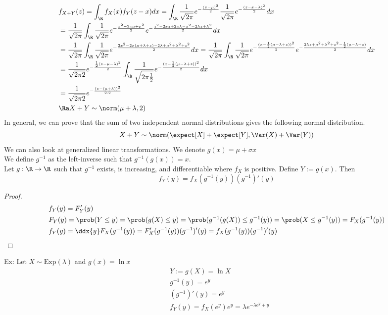 \begin{align*}
    &f_{X+Y}(z)=\int_\R f_X(x)f_Y(z-x)dx=\int_\R\frac{1}{\sqrt{2\pi}}e^{-\frac{(x-\mu)^2}{2}}\frac{1}{\sqrt{2\pi}}e^{-\frac{(z-x-\lambda)^2}{2}}dx\\
    &=\frac{1}{\sqrt{2\pi}}\int_\R\frac{1}{\sqrt{2\pi}}e^{-\frac{x^2-2x\mu+\mu^2}{2}}e^{-\frac{z^2-2xz+2x\lambda-x^2-2\lambda z+\lambda^2}{2}}dx\\
    &=\frac{1}{\sqrt{2\pi}}\int_\R\frac{1}{\sqrt{2\pi}} e^{-\frac{2x^2-2x(\mu+\lambda+z)-2\lambda+\mu^2+\lambda^2+z^2}{2}}dx=\frac{1}{\sqrt{2\pi}}\int_\R\frac{1}{\sqrt{2\pi}}e^{-\frac{(x-\frac{1}{2}(\mu-\lambda+z))^2}{2}}e^{-\frac{2\lambda z+\mu^2+\lambda^2+z^2-\frac{1}{2}(\mu-\lambda+z)}{2}}dx\\
    &=\frac{1}{\sqrt{2\pi 2}}e^{-\frac{\frac{1}{2}(z-\mu-\lambda)^2}{2}}\int_\R\frac{1}{\sqrt{2\pi\frac{1}{2}}}e^{-\frac{(x-\frac{1}{2}(\mu-\lambda+z))^2}{2}}dx\\
    &=\frac{1}{\sqrt{2\pi2}}e^{-\frac{(z-(\mu+\lambda))^2}{2\cdot 2}}\\
    &\Ra X+Y\sim\norm(\mu+\lambda,2)
\end{align*}
In general, we can prove that the sum of two independent normal distributions gives the following normal distribution.
\[X+Y\sim\norm(\expect[X]+\expect[Y],\Var(X)+\Var(Y))\]
We can also look at generalized linear transformations. We denote $g(x)=\mu+\sigma x$\\
We define $g^{-1}$ as the left-inverse such that $g^{-1}(g(x))=x$.\\
Let $g:\R\to\R$ such that $g^{-1}$ exists, is increasing, and differentiable where $f_X$ is positive. Define $Y:=g(x)$. Then
\[f_Y(y)=f_X(g^{-1}(y))(g^{-1})'(y)\]
\begin{proof}
\begin{align*}
    &f_Y(y)=F_Y'(y)\\
    &F_Y(y)=\prob(Y\leq y)=\prob(g(X)\leq y)=\prob(g^{-1}(g(X))\leq g^{-1}(y))=\prob(X\leq g^{-1}(y))=F_X(g^{-1}(y))\\
    &f_Y(y)=\ddx{y}F_X(g^{-1}(y))=F_X'(g^{-1}(y))(g^{-1})'(y)=f_X(g^{-1}(y))(g^{-1})'(y)
\end{align*}
\end{proof}
Ex: Let $X\sim\mathrm{Exp}(\lambda)$ and $g(x)=\ln x$
\begin{align*}
    &Y:=g(X)=\ln X\\
    &g^{-1}(y)=e^y\\
    &(g^{-1})'(y)=e^y\\
    &f_Y(y)=f_X(e^y)e^y=\lambda e^{-\lambda e^y+y}
\end{align*}

